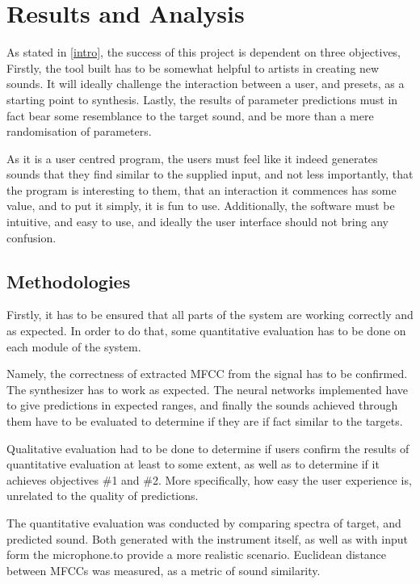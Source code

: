 \chapter{Results and Analysis}

As stated in \autoref{intro}, the success of this project is dependent
on three objectives, Firstly, the tool built has to be somewhat
helpful to artists in creating new sounds. It will ideally challenge
the interaction between a user, and presets, as a starting point to
synthesis. Lastly, the results of parameter predictions must in fact
bear some resemblance to the target sound, and be more than a mere
randomisation of parameters.

As it is a user centred program, the users must feel like it indeed
generates sounds that they find similar to the supplied input, and not
less importantly, that the program is interesting to them, that an
interaction it commences has some value, and to put it simply, it is
fun to use. Additionally, the software must be intuitive, and easy to
use, and ideally the user interface should not bring any confusion.

\section{Methodologies}

Firstly, it has to be ensured that all parts of the system are working
correctly and as expected. In order to do that, some quantitative
evaluation has to be done on each module of the system.

Namely, the correctness of extracted MFCC from the signal has to be
confirmed. The synthesizer has to work as expected. The neural
networks implemented have to give predictions in expected ranges, and
finally the sounds achieved through them have to be evaluated to
determine if they are if fact similar to the targets.

Qualitative evaluation had to be done to determine if users confirm
the results of quantitative evaluation at least to some extent, as well
as to determine if it achieves objectives \#1 and \#2. More
specifically, how easy the user experience is, unrelated to the
quality of predictions.

The quantitative evaluation was conducted by comparing spectra of
target, and predicted sound. Both generated with the instrument
itself, as well as with input form the microphone.to provide a more
realistic scenario. Euclidean distance between MFCCs was measured, as
a metric of sound similarity.

